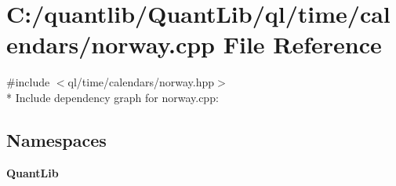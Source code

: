 \section{C\+:/quantlib/\+Quant\+Lib/ql/time/calendars/norway.cpp File Reference}
\label{norway_8cpp}
{\ttfamily \#include $<$ql/time/calendars/norway.\+hpp$>$}\\*
Include dependency graph for norway.\+cpp\+:
\subsection*{Namespaces}
\begin{DoxyCompactItemize}
\item 
 {\bf Quant\+Lib}
\end{DoxyCompactItemize}
